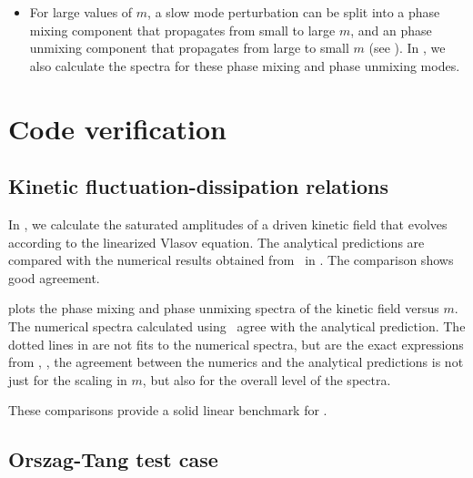 \begin{itemize}
            \item 
            For large values of $m$, a slow mode perturbation can be split into a phase mixing
            component that propagates from small to large $m$, and an phase unmixing
            component that propagates from large to small $m$ (see
            ). In \Gand, we also calculate the spectra for these
            phase mixing and phase unmixing modes.
        \end{itemize}


\section{Code verification}
    

    \subsection{Kinetic fluctuation-dissipation relations}

    In , we calculate the saturated amplitudes of a driven kinetic
    field that evolves according to the linearized Vlasov equation.
    The analytical predictions are compared with the numerical results obtained from
    \Gand\ in . The comparison shows good agreement.

     plots the phase mixing and phase unmixing spectra of the kinetic field versus $m$. The
    numerical spectra calculated using \Gand\ agree with the analytical
    prediction. The dotted lines in  are not fits to the
    numerical spectra, but are the exact expressions from
    , \ie, the agreement between the
    numerics and the analytical predictions is not just for the scaling in $m$, but also
    for the overall level of the spectra.

    These comparisons provide a solid linear benchmark for \Gand.


    \subsection{Orszag-Tang test case}

